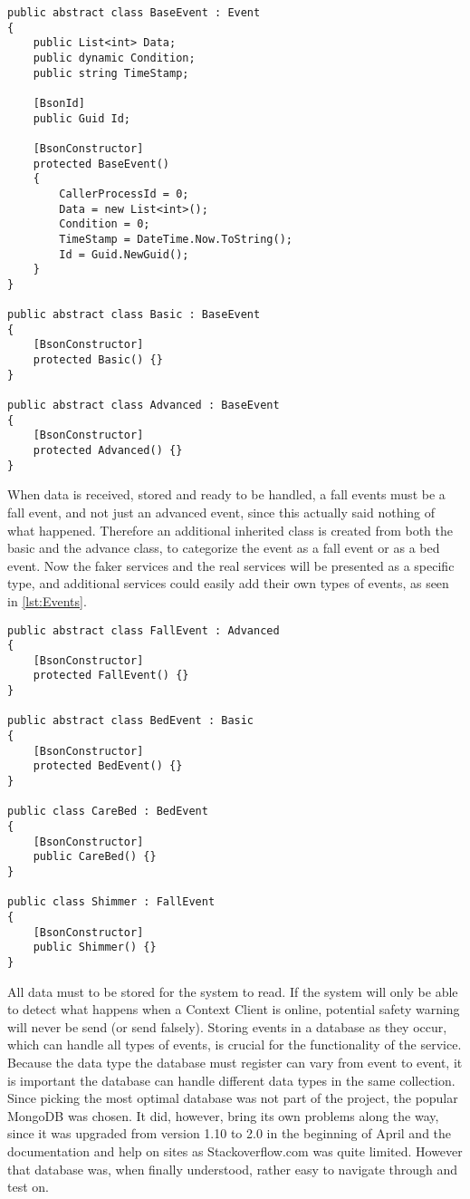 \begin{lstlisting}[caption=The BaseEvent class with inherited Basic and Advanced class, style=Code-C++, label=lst:BaseEvent]
public abstract class BaseEvent : Event
{
	public List<int> Data;
	public dynamic Condition;
	public string TimeStamp;

	[BsonId] 
	public Guid Id;

	[BsonConstructor]
	protected BaseEvent()
	{
		CallerProcessId = 0;
		Data = new List<int>();
		Condition = 0;
		TimeStamp = DateTime.Now.ToString();
		Id = Guid.NewGuid();
	}
}

public abstract class Basic : BaseEvent
{
	[BsonConstructor]
	protected Basic() {}
}

public abstract class Advanced : BaseEvent
{
	[BsonConstructor]
	protected Advanced() {}
}
\end{lstlisting}


When data is received, stored and ready to be handled, a fall events must be a fall event, and not just an advanced event, since this actually said nothing of what happened.
Therefore an additional inherited class is created from both the basic and the advance class, to categorize the event as a fall event or as a bed event.
Now the faker services and the real services will be presented as a specific type, and additional services could easily add their own types of events, as seen in \codeTitle \ref{lst:Events}.

\begin{lstlisting}[caption=Inherited classes of the Basic and Advance class., style=Code-C++, label=lst:Events]
public abstract class FallEvent : Advanced
{
	[BsonConstructor]
	protected FallEvent() {}
}

public abstract class BedEvent : Basic
{
	[BsonConstructor]
	protected BedEvent() {}
}

public class CareBed : BedEvent
{
	[BsonConstructor]
	public CareBed() {}
}

public class Shimmer : FallEvent
{
	[BsonConstructor]
	public Shimmer() {}
}
\end{lstlisting}

All data must to be stored for the system to read.
If the system will only be able to detect what happens when a Context Client\cite{JCAF} is online, potential safety warning will never be send (or send falsely).
Storing events in a database as they occur, which can handle all types of events, is crucial for the functionality of the service.
Because the data type the database must register can vary from event to event, it is important the database can handle different data types in the same collection.
Since picking the most optimal database was not part of the project, the popular MongoDB\cite{MongoDB-ref} was chosen.
It did, however, bring its own problems along the way, since it was upgraded from version 1.10 to 2.0 in the beginning of April\cite{MongoDB-update} and the documentation and help on sites as Stackoverflow.com was quite limited.
However that database was, when finally understood, rather easy to navigate through and test on.

